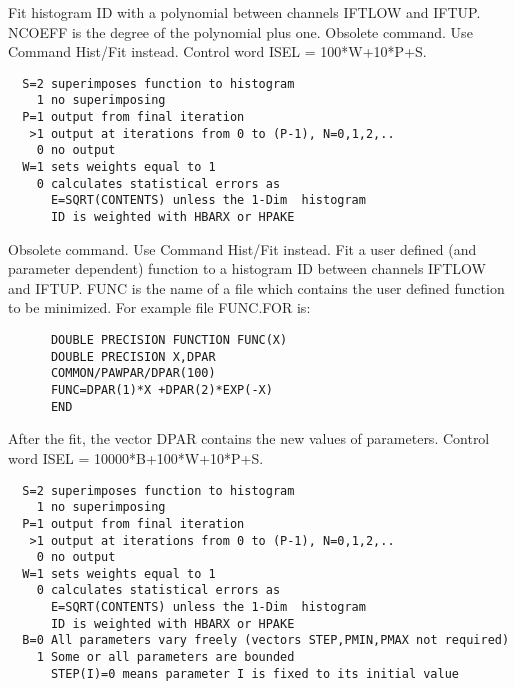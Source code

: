 \BEGARG
{}
\ENDARG
\BEGTEXT
Fit histogram ID with a polynomial between channels IFTLOW and IFTUP.
NCOEFF is the degree of the polynomial plus one.
Obsolete command. Use Command Hist/Fit instead.
Control word ISEL = 100*W+10*P+S.
\begin{verbatim}
  S=2 superimposes function to histogram
    1 no superimposing
  P=1 output from final iteration
   >1 output at iterations from 0 to (P-1), N=0,1,2,..
    0 no output
  W=1 sets weights equal to 1
    0 calculates statistical errors as
      E=SQRT(CONTENTS) unless the 1-Dim  histogram
      ID is weighted with HBARX or HPAKE
\end{verbatim}
\ENDTEXT

\BEGARG
{}
\ENDARG
\BEGTEXT
Obsolete command. Use Command Hist/Fit instead.
Fit a user defined (and parameter dependent) function
to a histogram ID between channels IFTLOW and IFTUP.
FUNC is the name of a file which contains the user defined
function to be minimized. For example file FUNC.FOR is:
\begin{verbatim}
      DOUBLE PRECISION FUNCTION FUNC(X)
      DOUBLE PRECISION X,DPAR
      COMMON/PAWPAR/DPAR(100)
      FUNC=DPAR(1)*X +DPAR(2)*EXP(-X)
      END
\end{verbatim}
After the fit, the vector DPAR contains the new values
of parameters.
Control word ISEL = 10000*B+100*W+10*P+S.
\begin{verbatim}
  S=2 superimposes function to histogram
    1 no superimposing
  P=1 output from final iteration
   >1 output at iterations from 0 to (P-1), N=0,1,2,..
    0 no output
  W=1 sets weights equal to 1
    0 calculates statistical errors as
      E=SQRT(CONTENTS) unless the 1-Dim  histogram
      ID is weighted with HBARX or HPAKE
  B=0 All parameters vary freely (vectors STEP,PMIN,PMAX not required)
    1 Some or all parameters are bounded
      STEP(I)=0 means parameter I is fixed to its initial value
\end{verbatim}
\ENDTEXT


